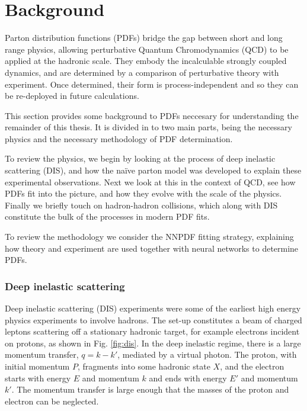 \chapter{Background}

Parton distribution functions (PDFs) bridge the gap between short and long range physics, allowing perturbative Quantum Chromodynamics (QCD) to be applied at the hadronic scale. They embody the incalculable strongly coupled dynamics, and are determined by a comparison of perturbative theory with experiment. Once determined, their form is process-independent and so they can be re-deployed in future calculations. 

This section provides some background to PDFs neccesary for understanding the remainder of this thesis. It is divided in to two main parts, being the necessary physics and the necessary methodology of PDF determination.

To review the physics, we begin by looking at the process of deep inelastic scattering (DIS), and how the na\"ive parton model was developed to explain these experimental observations. Next we look at this in the context of QCD, see how PDFs fit into the picture, and how they evolve with the scale of the physics. Finally we briefly touch on hadron-hadron collisions, which along with DIS constitute the bulk of the processes in modern PDF fits.

To review the methodology we consider the NNPDF fitting strategy, explaining how theory and experiment are used together with neural networks to determine PDFs.

\subsection{Deep inelastic scattering}

Deep inelastic scattering (DIS) experiments were some of the earliest high energy physics experiments to involve hadrons. The set-up constitutes a beam of charged leptons scattering off a stationary hadronic target, for example electrons incident on protons, as shown in Fig. \ref{fig:dis}. In the deep inelastic regime, there is a large momentum transfer, $q=k-k'$, mediated by a virtual photon. The proton, with initial momentum $P$, fragments into some hadronic state $X$, and the electron starts with energy $E$ and momentum $k$ and ends with energy $E'$ and momentum $k'$. The momentum transfer is large enough that the masses of the proton and electron can be neglected. 

